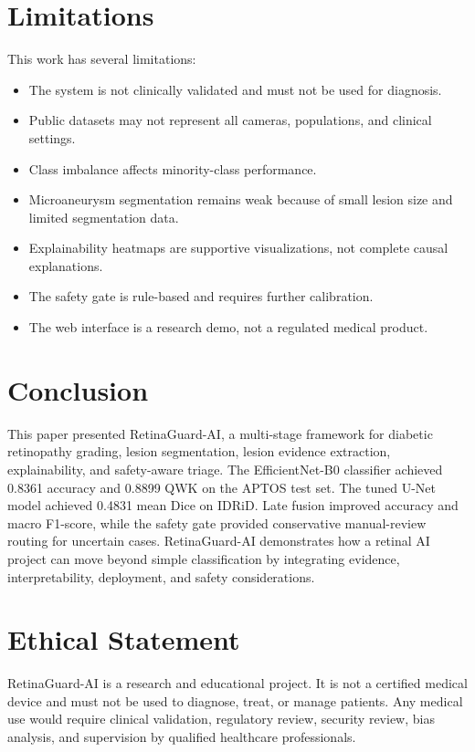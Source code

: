 \documentclass[conference]{IEEEtran}
\begin{document}
\section{Limitations}
This work has several limitations:
\begin{itemize}
    \item The system is not clinically validated and must not be used for diagnosis.
    \item Public datasets may not represent all cameras, populations, and clinical settings.
    \item Class imbalance affects minority-class performance.
    \item Microaneurysm segmentation remains weak because of small lesion size and limited segmentation data.
    \item Explainability heatmaps are supportive visualizations, not complete causal explanations.
    \item The safety gate is rule-based and requires further calibration.
    \item The web interface is a research demo, not a regulated medical product.
\end{itemize}

\section{Conclusion}
This paper presented RetinaGuard-AI, a multi-stage framework for diabetic retinopathy grading, lesion segmentation, lesion evidence extraction, explainability, and safety-aware triage. The EfficientNet-B0 classifier achieved 0.8361 accuracy and 0.8899 QWK on the APTOS test set. The tuned U-Net model achieved 0.4831 mean Dice on IDRiD. Late fusion improved accuracy and macro F1-score, while the safety gate provided conservative manual-review routing for uncertain cases. RetinaGuard-AI demonstrates how a retinal AI project can move beyond simple classification by integrating evidence, interpretability, deployment, and safety considerations.

\section*{Ethical Statement}
RetinaGuard-AI is a research and educational project. It is not a certified medical device and must not be used to diagnose, treat, or manage patients. Any medical use would require clinical validation, regulatory review, security review, bias analysis, and supervision by qualified healthcare professionals.

\balance


\end{document}
